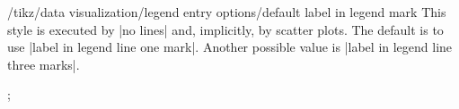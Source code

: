 \begin{stylekey}{/tikz/data visualization/legend entry options/default label in legend mark}
    This style is executed by |no lines| and, implicitly, by scatter plots. The
    default is to use |label in legend line one mark|. Another possible value
    is |label in legend line three marks|.
\begin{codeexample}[width=5cm,preamble={\usetikzlibrary{datavisualization}}]
\tikz \datavisualization [
  visualize as scatter/.list={a,b,c},
  style sheet=cross marks,
  legend entry options/default label in legend mark/.style=
    label in legend three marks,
  a={label in legend={text=example a}},
  b={label in legend={text=example b}},
  c={label in legend={text=example c}}];
\end{codeexample}
\end{stylekey}

